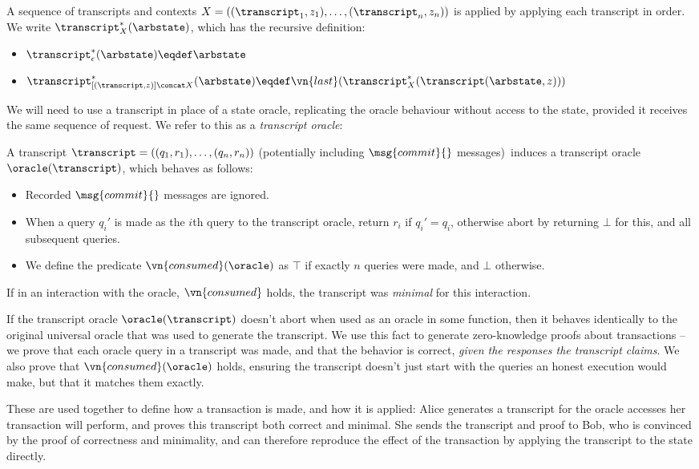 \begin{definition}
  A sequence of transcripts and contexts $X = ((\transcript_1, z_1), \ldots,
  (\transcript_n, z_n))$ is applied by applying each transcript in order. We write
  $\transcript^*_X(\arbstate)$, which has the recursive definition:
  \begin{itemize}
    \item $\transcript^*_\epsilon(\arbstate) \eqdef \arbstate$
    \item $\transcript^*_{[(\transcript, z)] \concat X}(\arbstate) \eqdef
      \vn{last}(\transcript^*_X(\transcript(\arbstate, z)))$
  \end{itemize}
\end{definition}

We will need to use a transcript in place of a state oracle, replicating the
oracle behaviour without access to the state, provided it receives the same
sequence of request. We refer to this as a \emph{transcript oracle}:

\begin{definition}
  A transcript $\transcript = ((q_1, r_1), \ldots, (q_n, r_n))$
  (potentially including $\msg{commit}{}$ messages)\ induces a
  transcript oracle $\oracle(\transcript)$, which behaves as follows:
  \begin{itemize}
    \item Recorded $\msg{commit}{}$ messages are ignored.
    \item When a query $q_i'$ is made as the $i$th query to the transcript
      oracle, return $r_i$ if $q_i' = q_i$, otherwise abort by returning $\bot$
      for this, and all subsequent queries.
    \item We define the predicate $\vn{consumed}(\oracle)$ as $\top$ if exactly $n$
      queries were made, and $\bot$ otherwise.
  \end{itemize}
  If in an interaction with the oracle, $\vn{consumed}$ holds, the transcript
  was \emph{minimal} for this interaction.
\end{definition}

If the transcript oracle $\oracle(\transcript)$ doesn't abort when used as an
oracle in some function, then it behaves identically to the original universal
oracle that was used to generate the transcript. We use this fact to generate
zero-knowledge proofs about transactions -- we prove that each oracle query in a
transcript was made, and that the behavior is correct, \emph{given the
  responses the transcript claims}. We also prove that $\vn{consumed}(\oracle)$
holds, ensuring the transcript doesn't just start with the queries an honest
execution would make, but that it matches them exactly.

These are used together to define how a transaction is made, and how it is
applied: Alice generates a transcript for the oracle accesses her transaction
will perform, and proves this transcript both correct and minimal. She sends the
transcript and proof to Bob, who is convinced by the proof of correctness and
minimality, and can therefore reproduce the effect of the transaction by
applying the transcript to the state directly.

